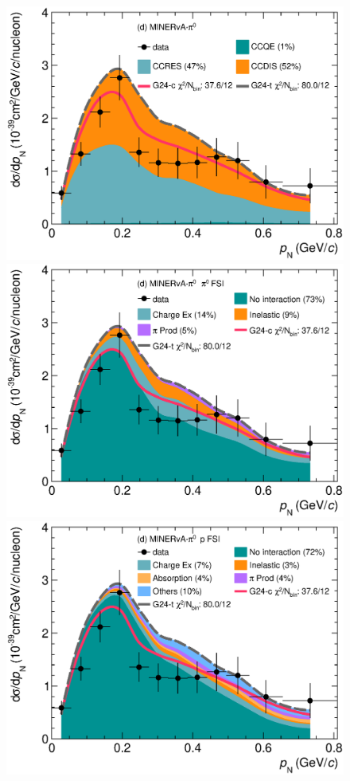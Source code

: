 \begin{figure}[!htb] 	
    \centering 		
    \includegraphics[width=\trfigwid\textwidth]{figures/tuning/0013-min_pi0_pn_reac_decomp.eps}
    \includegraphics[width=\trfigwid\textwidth]{figures/tuning/0013-min_pi0_pn_pi0_decomp.eps}
    \includegraphics[width=\trfigwid\textwidth]{figures/tuning/0013-min_pi0_pn_pr_decomp.eps}

\end{figure}
